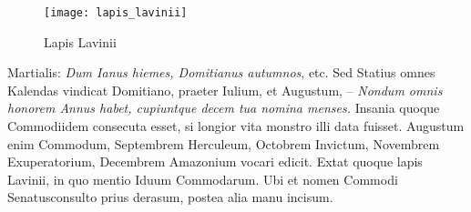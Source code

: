 %     
\begin{figure}[t]
  \centering
  \texttt{[image: lapis\_lavinii]}
  \caption{Lapis Lavinii}
  \label{fig:lapis_lavinii}
\end{figure}
Martialis:
 \textit{Dum Ianus hiemes, Domitianus
autumnos}, etc.
Sed Statius omnes
Kalendas vindicat Domitiano,
praeter Iulium, et Augustum,
– \textit{Nondum omnis honorem
Annus habet, cupiuntque decem tua
nomina menses.}
Insania quoque
Commodiidem consecuta esset, si
longior vita monstro illi data fuisset.
Augustum enim Commodum,
Septembrem Herculeum, Octobrem
Invictum, Novembrem
Exuperatorium, Decembrem
Amazonium vocari edicit.
Extat
quoque lapis Lavinii, in quo mentio
Iduum Commodarum.
Ubi et
nomen Commodi Senatusconsulto prius derasum, postea alia manu
incisum.

